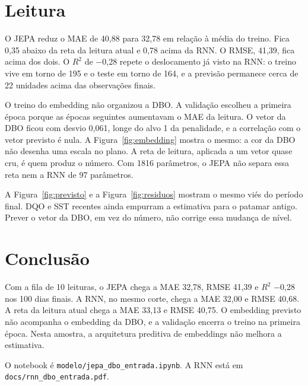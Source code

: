 \documentclass[11pt,a4paper]{article}
\begin{document}
\section{Leitura}

O JEPA reduz o MAE de 40,88 para 32,78 em relação à média do treino. Fica 0,35 abaixo da reta da leitura atual e 0,78 acima da RNN. O RMSE, 41,39, fica acima dos dois. O \(R^{2}\) de $-$0,28 repete o deslocamento já visto na RNN: o treino vive em torno de 195 e o teste em torno de 164, e a previsão permanece cerca de 22 unidades acima das observações finais.

O treino do embedding não organizou a DBO. A validação escolheu a primeira época porque as épocas seguintes aumentavam o MAE da leitura. O vetor da DBO ficou com desvio 0,061, longe do alvo 1 da penalidade, e a correlação com o vetor previsto é nula. A Figura~\ref{fig:embedding} mostra o mesmo: a cor da DBO não desenha uma escala no plano. A reta de leitura, aplicada a um vetor quase cru, é quem produz o número. Com 1816 parâmetros, o JEPA não separa essa reta nem a RNN de 97 parâmetros.

A Figura~\ref{fig:previsto} e a Figura~\ref{fig:residuos} mostram o mesmo viés do período final. DQO e SST recentes ainda empurram a estimativa para o patamar antigo. Prever o vetor da DBO, em vez do número, não corrige essa mudança de nível.

\section{Conclusão}

Com a fila de 10 leituras, o JEPA chega a MAE 32,78, RMSE 41,39 e \(R^{2}\) $-$0,28 nos 100 dias finais. A RNN, no mesmo corte, chega a MAE 32,00 e RMSE 40,68. A reta da leitura atual chega a MAE 33,13 e RMSE 40,75. O embedding previsto não acompanha o embedding da DBO, e a validação encerra o treino na primeira época. Nesta amostra, a arquitetura preditiva de embeddings não melhora a estimativa.

O notebook é \texttt{modelo/jepa\_dbo\_entrada.ipynb}. A RNN está em \texttt{docs/rnn\_dbo\_entrada.pdf}.
\end{document}

